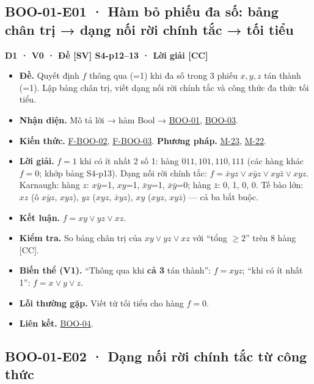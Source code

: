 \documentclass[
  10pt,
  twoside,openany]{book}
\providecommand{\tightlist}{%
  \setlength{\itemsep}{0pt}\setlength{\parskip}{0pt}}
\begin{document}
\hypertarget{BOO-01-E01}{%
\subsection{BOO-01-E01 · Hàm bỏ phiếu đa số: bảng chân trị → dạng nối
rời chính tắc → tối tiểu}\label{BOO-01-E01}}

\textbf{D1 · V0 · Đề {[}SV{]} S4-p12--13 · Lời giải {[}CC{]}}

\begin{itemize}
\tightlist
\item
  \textbf{Đề.} Quyết định \(f\) thông qua (=1) khi đa số trong 3 phiếu
  \(x,y,z\) tán thành (=1). Lập bảng chân trị, viết dạng nối rời chính
  tắc và công thức đa thức tối tiểu.
\item
  \textbf{Nhận diện.} Mô tả lời → hàm Bool →
  \protect\hyperlink{BOO-01}{BOO-01},
  \protect\hyperlink{BOO-03}{BOO-03}.
\item
  \textbf{Kiến thức.} \protect\hyperlink{F-BOO-02}{F-BOO-02},
  \protect\hyperlink{F-BOO-03}{F-BOO-03}. \textbf{Phương pháp.}
  \protect\hyperlink{M-23}{M-23}, \protect\hyperlink{M-22}{M-22}.
\item
  \textbf{Lời giải.} \(f=1\) khi có ít nhất 2 số 1: hàng
  \(011,101,110,111\) (các hàng khác \(f=0\); khớp bảng S4-p13). Dạng
  nối rời chính tắc: \(f=\bar xyz\vee x\bar yz\vee xy\bar z\vee xyz\).
  Karnaugh: hàng \(z\): \(x\bar y\)=1, \(xy\)=1, \(\bar xy\)=1,
  \(\bar x\bar y\)=0; hàng \(\bar z\): 0, 1, 0, 0. Tế bào lớn: \(xz\) (ô
  \(x\bar yz\), \(xyz\)), \(yz\) (\(xyz\), \(\bar xyz\)), \(xy\)
  (\(xyz\), \(xy\bar z\)) --- cả ba bắt buộc.
\item
  \textbf{Kết luận.} \(f=xy\vee yz\vee xz\).
\item
  \textbf{Kiểm tra.} So bảng chân trị của \(xy\vee yz\vee xz\) với
  ``tổng \(\ge2\)'' trên 8 hàng {[}CC{]}.
\item
  \textbf{Biến thể (V1).} ``Thông qua khi \textbf{cả 3} tán thành'':
  \(f=xyz\); ``khi có ít nhất 1'': \(f=x\vee y\vee z\).
\item
  \textbf{Lỗi thường gặp.} Viết từ tối tiểu cho hàng \(f=0\).
\item
  \textbf{Liên kết.} \protect\hyperlink{BOO-04}{BOO-04}.
\end{itemize}

\hypertarget{BOO-01-E02}{%
\subsection{BOO-01-E02 · Dạng nối rời chính tắc từ công
thức}\label{BOO-01-E02}}
\end{document}
